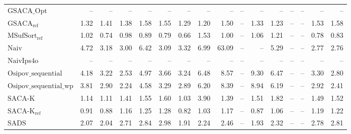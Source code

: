 \begin{table}[h]
{\begin{tabular}{lrrrrrrrrrrrrrrr}
    $\text{GSACA\_Opt}$ & {\color{darkgray}--} & {\color{darkgray}--} & {\color{darkgray}--} & {\color{darkgray}--} & {\color{darkgray}--} & {\color{darkgray}--} & {\color{darkgray}--} & {\color{darkgray}--} & {\color{darkgray}--} & {\color{darkgray}--} & {\color{darkgray}--} & {\color{darkgray}--} & {\color{darkgray}--} & {\color{darkgray}--} & {\color{darkgray}--} \\
    $\text{GSACA}_{\text{ref}}$ & 1.32 & 1.41 & 1.38 & 1.58 & 1.55 & 1.29 & 1.20 & 1.50 & {\color{darkgray}--} & 1.33 & 1.23 & {\color{darkgray}--} & {\color{darkgray}--} & 1.53 & 1.58 \\
    $\text{MSufSort}_{\text{ref}}$ & 1.02 & 0.74 & 0.98 & 0.89 & 0.79 & 0.66 & 1.53 & 1.00 & {\color{darkgray}--} & 1.06 & 1.21 & {\color{darkgray}--} & {\color{darkgray}--} & 0.78 & 0.83 \\
    $\text{Naiv}$ & 4.72 & 3.18 & 3.00 & 6.42 & 3.09 & 3.32 & 6.99 & {\color{red}63.09} & {\color{darkgray}--} & {\color{darkgray}--} & 5.29 & {\color{darkgray}--} & {\color{darkgray}--} & 2.77 & 2.76 \\
    $\text{NaivIps4o}$ & {\color{darkgray}--} & {\color{darkgray}--} & {\color{darkgray}--} & {\color{darkgray}--} & {\color{darkgray}--} & {\color{darkgray}--} & {\color{darkgray}--} & {\color{darkgray}--} & {\color{darkgray}--} & {\color{darkgray}--} & {\color{darkgray}--} & {\color{darkgray}--} & {\color{darkgray}--} & {\color{darkgray}--} & {\color{darkgray}--} \\
    $\text{Osipov\_sequential}$ & 4.18 & 3.22 & 2.53 & 4.97 & 3.66 & 3.24 & 6.48 & 8.57 & {\color{darkgray}--} & 9.30 & 6.47 & {\color{darkgray}--} & {\color{darkgray}--} & 3.30 & 2.80 \\
    $\text{Osipov\_sequential\_wp}$ & 3.81 & 2.90 & 2.24 & 4.58 & 3.29 & 2.89 & 6.20 & 8.39 & {\color{darkgray}--} & 8.94 & 6.19 & {\color{darkgray}--} & {\color{darkgray}--} & 2.92 & 2.41 \\
    $\text{SACA-K}$ & 1.14 & 1.11 & 1.41 & 1.55 & 1.60 & 1.03 & 3.90 & 1.39 & {\color{darkgray}--} & 1.51 & 1.82 & {\color{darkgray}--} & {\color{darkgray}--} & 1.49 & 1.52 \\
    $\text{SACA-K}_{\text{ref}}$ & 0.91 & 0.88 & 1.16 & 1.25 & 1.28 & 0.82 & 1.03 & 1.17 & {\color{darkgray}--} & 0.87 & 1.06 & {\color{darkgray}--} & {\color{darkgray}--} & 1.19 & 1.22 \\
    $\text{SADS}$ & 2.07 & 2.04 & 2.71 & 2.84 & 2.98 & 1.91 & 2.24 & 2.46 & {\color{darkgray}--} & 1.93 & 2.32 & {\color{darkgray}--} & {\color{darkgray}--} & 2.78 & 2.81 \\

\end{tabular}}
\end{table}
